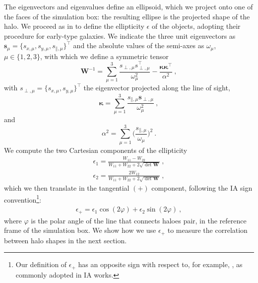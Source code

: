 \documentclass[a4paper,fleqn,usenatbib]{mnras}
\begin{document}
The eigenvectors and eigenvalues define an ellipsoid, which we project onto one of the faces of the simulation box: the resulting ellipse is the projected shape of the halo. We proceed as in \citet{Joachimietal2013b} to define the ellipticity $\epsilon$ of the objects, adopting their procedure for early-type galaxies. We indicate the three unit eigenvectors as $\mathbf{s}_{\mu} = \big \{ s_{x, \mu}, s_{y, \mu}, s_{\mathbin{\|}, \mu}\big \}^\intercal$ and the absolute values of the semi-axes as $\omega_{\mu}$, $\mu \in \{1,2,3\}$, with which we define a symmetric tensor
\begin{equation}
    \mathbf{W}^{-1} = \sum _{\mu=1}^{3} \frac{s_{\perp, \mu} s^\intercal_{\perp, \mu}}{\omega_{\mu}^2} - \frac{\mathbf{\kappa}\mathbf{\kappa}^{\intercal}}{\alpha^2} \ ,
	\label{eq:symtensor}
\end{equation}
with $s_{\perp, \mu} = \big \{ s_{x, \mu}, s_{y, \mu}\big \}^\intercal$ the eigenvector projected along the line of sight, 
\begin{equation}
   \mathbf{\kappa} = \sum_{\mu = 1}^{3} \frac{s_{\mathbin{\|}, \mu} \mathbf{s}_{\perp, \mu}}{\omega_{\mu}^2} \ ,
	\label{eq:kappa}
\end{equation}
and 
\begin{equation}
    \alpha^2=\sum_{\mu = 1}^{3} \bigg( \frac{s_{\mathbin{\|}, \mu}}{\omega_{\mu}} \bigg)^2 \ .
	\label{eq:alpha}
\end{equation}
We compute the two Cartesian components of the ellipticity \citep{BartelmannSchneider2001}
\begin{align}
    	\epsilon_{1} = \frac{W_{11} - W_{22}}{W_{11} + W_{22}+2\sqrt{\det \mathbf{W}}}\ , \\ 
           \epsilon_{2} = \frac{2 W_{12}}{W_{11} + W_{22}+2\sqrt{\det \mathbf{W}}} \ ,
\end{align}
which we then translate in the tangential $(+)$ 
component, following the IA sign convention\footnote{Our definition of $\epsilon_{+}$ has an opposite sign with respect to, for example, \citet{BartelmannSchneider2001}, as commonly adopted in IA works.}:
\begin{align}
	\epsilon_{+} = \epsilon_{1} \cos(2\varphi) + \epsilon_{2} \sin(2\varphi)\ ,%
\end{align}
where $\varphi$ is the polar angle of the line that connects haloes pair, in the reference frame of the simulation box. We show how we use $\epsilon_{+}$ to measure the correlation between halo shapes in the next section.
\end{document}
